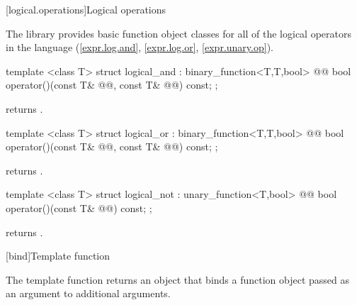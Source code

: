 \documentclass[american,twoside]{book}
\begin{document}
[logical.operations]{Logical operations}

\pnum
The library provides basic function object classes for all of the logical
operators in the language (\ref{expr.log.and}, \ref{expr.log.or}, \ref{expr.unary.op}).

%
\begin{itemdecl}
template <class T> struct logical_and : binary_function<T,T,bool> {
  @@
    bool operator()(const T& @@, const T& @@) const;
};
\end{itemdecl}

\begin{itemdescr}
\pnum
{} returns .
\end{itemdescr}

%
\begin{itemdecl}
template <class T> struct logical_or : binary_function<T,T,bool> {
  @@
    bool operator()(const T& @@, const T& @@) const;
};
\end{itemdecl}

\begin{itemdescr}
\pnum
{} returns .
\end{itemdescr}

%
\begin{itemdecl}
template <class T> struct logical_not : unary_function<T,bool> {
  @@
    bool operator()(const T& @@) const;
};
\end{itemdecl}

\begin{itemdescr}
\pnum
{} returns .
\end{itemdescr}

\setcounter{subsection}{9}
[bind]{\marktr{}Template function }

\pnum
The template function  returns an object that binds a
function object passed as an argument to additional arguments.

\pnum
{}
\end{document}
